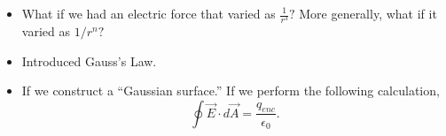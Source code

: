 \documentclass[12pt]{extreport}
\begin{document}
\begin{itemize}
\begin{itemize}
			\item What if we had an electric force that varied as $\frac 1 {r^3}?$ More generally, what if it varied as $1/r^n?$

			\item Introduced Gauss's Law.

			\item If we construct a ``Gaussian surface.'' If we perform the following calculation, $$\oint \vec E \cdot d \vec A = \frac{q_{enc}}{\epsilon_0}.$$

		\end{itemize}
\end{itemize}
\end{document}
